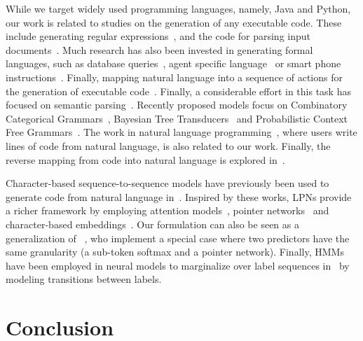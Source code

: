 \documentclass[11pt]{article}
\begin{document}
While we target widely used programming languages, namely, Java and Python, our
work is related to studies on the generation of any executable code. These include
generating regular expressions~\cite{kushman-barzilay:2013:NAACL-HLT}, and the
code for parsing input documents~\cite{lei-EtAl:2013:ACL2013}. Much research
has also been invested in generating formal languages, such as database
queries~\cite{zelle:aaai96,BerantCFL13}, agent specific language~\cite{kate:aaai05} or smart phone instructions~\cite{Le:2013:SSS:2462456.2464443}. Finally, mapping natural language into a sequence of actions for the generation of executable code~\cite{Branavan:2009:RLM:1687878.1687892}.
Finally, a considerable effort in this task has focused on
semantic
parsing~\cite{Wong:2006:LSP:1220835.1220891,Jones:2012:SPB:2390524.2390593,lei-EtAl:2013:ACL2013,artzi-lee-zettlemoyer:2015:EMNLP,quirk:acl15}.
Recently proposed models focus on Combinatory Categorical
Grammars~\cite{kushman-barzilay:2013:NAACL-HLT,artzi-lee-zettlemoyer:2015:EMNLP},
Bayesian Tree
Transducers~\cite{Jones:2012:SPB:2390524.2390593,lei-EtAl:2013:ACL2013} and
Probabilistic Context Free Grammars~\cite{andreas-vlachos-clark:2013:Short}. The
work in natural language
programming~\cite{vadas-curran:2005:ALTA20052,conf/aaai/ManshadiGA13}, where
users write lines of code from natural language, is also related to our work.
Finally, the reverse mapping from code into natural language is explored in~\cite{oda15ase}.

Character-based sequence-to-sequence models have previously been used to generate code from natural language in~\cite{DBLP:journals/corr/MouMLZJ15}.
Inspired by these works, LPNs provide a richer framework by employing attention models~\cite{DBLP:journals/corr/BahdanauCB14}, pointer networks~\cite{NIPS2015_5866} and character-based embeddings~\cite{wang:2015}.
Our formulation can also be seen as a generalization of ~, who implement a special case where two predictors have the same granularity (a sub-token softmax and a pointer network).
Finally, HMMs have been employed in neural models to marginalize over label sequences in~\cite{Collobert:2011:NLP:1953048.2078186,2016arXiv160301360L} by modeling transitions between labels.

\section{Conclusion}
\label{sec:conclusion}
\end{document}
